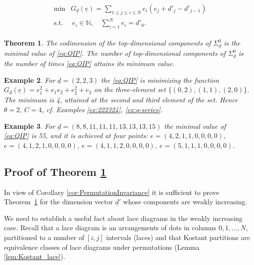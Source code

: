 \documentclass[a4paper]{amsart}
\newcommand{\N}{\mathbb{N}}
\newcommand{\ud}{\underline{d}}
\newcommand{\ue}{\underline{e}}
\newtheorem{thm}{Theorem}[section]
\theoremstyle{plain}
\newtheorem{example}[thm]{Example}
\begin{document}
\begin{align}
\tag{QIP} \label{eq:QIP}
& \begin{array}{rl} \min & \displaystyle G_{\ud}(\ue)=\sum_{1\leq j\leq i\leq N} e_i(e_j+d'_j-d'_{j-1}) \\[.1in] \text{s.t.} & \displaystyle \ e_i\in \N, \quad \sum_{i=1}^N e_i=d'_0.
\end{array}
\end{align}

\begin{thm} \label{thm:QIP}
    The codimension of the top-dimensional components of $\Sigma^0_{\ud}$ is the minimal value of \eqref{eq:QIP}. The number of top-dimensional components of $\Sigma^0_{\ud}$ is the number of times \eqref{eq:QIP} attains its minimum value.
\end{thm}

\begin{example} \rm \label{ex:223withQIP}
  For $\ud=(2,2,3)$ the \eqref{eq:QIP} is minimizing the function $G_{\ud}(\ue)=e_1^2+e_1e_2+e_2^2+e_2$ on the three-element set $\{(0,2),(1,1),(2,0)\}$. The minimum is 4, attained at the second and third element of the set. Hence $\theta=2$, $C=4$, cf. Examples \ref{ex:222324}, \ref{ex:q-series}.  
\end{example}

\begin{example} \rm \label{ex:N8}
  For $\ud=(8,8,11,11,11,13,13,13,15)$ the minimal value of \eqref{eq:QIP} is 55, and it is achieved at four points: $e=(4,2,1,1,0,0,0,0)$, $e=(4,1,2,1,0,0,0,0)$, $e=(4,1,1,2,0,0,0,0)$, $e=(5,1,1,1,0,0,0,0)$. %
\end{example}

\subsection{Proof of Theorem \ref{thm:QIP}} 
\label{sec:ProofOfQIP}

In view of Corollary \ref{cor:PermutationInvariance} it is sufficient to prove Theorem~\ref{thm:QIP} for the dimension vector $\ud'$ whose components are weakly increasing.

We need to establish a useful fact about lace diagrams in the weakly increasing case. Recall that a lace diagram is an arrangements of dots in columns $0,1,\ldots,N$, partitioned to a number of $[i,j]$ intervals (laces) and that Kostant partitions are equivalence classes of lace diagrams under permutations (Lemma \ref{lem:Kostant_lace}).
\end{document}
